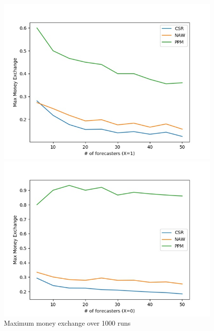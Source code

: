 \documentclass[english,10pt]{article}
\begin{document}
\begin{enumerate}
        	\begin{figure}[H]
        	\centering
        	\begin{minipage}{0.48\textwidth}
        	\includegraphics[width = \textwidth]{(Beta_1_0dot2)Max_MnEx(X=1).jpg}
        	\end{minipage}
        	\begin{minipage}{0.48\textwidth}
        	\includegraphics[width = \textwidth]{(Beta_1_0dot2)Max_MnEx(X=0).jpg}
        	\end{minipage}
        	\caption{Maximum money exchange over 1000 runs}
        	\end{figure}
        	

\end{enumerate}
\end{document}
